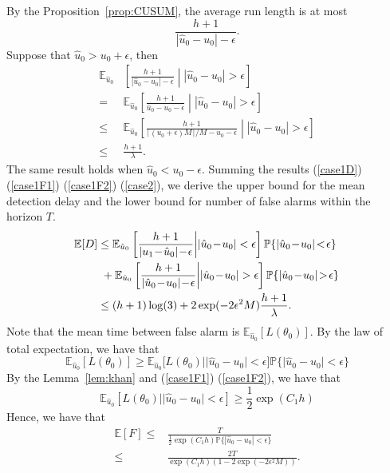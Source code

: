 \documentclass[letterpaper]{article} %
\begin{document}
By the Proposition~\ref{prop:CUSUM}, the average run length is at most
\begin{equation}
\frac{h+1}{|\hat{u}_0-u_0|-\epsilon}.
\end{equation}
Suppose that $\hat{u}_0>u_0+\epsilon$, then
\begin{align}
\mathbb{E}_{\hat{u}_0}&\left[\frac{h+1}{|\hat{u}_0-u_0|-\epsilon}\middle||\hat{u}_0-u_0|>\epsilon\right]\\
=&\mathbb{E}_{\hat{u}_0}\left[\frac{h+1}{\hat{u}_0-u_0-\epsilon}\middle||\hat{u}_0-u_0|>\epsilon\right]\\
\leq&\mathbb{E}_{\hat{u}_0}\left[\frac{h+1}{\lceil(u_0+\epsilon)M\rceil/M-u_0-\epsilon}\middle||\hat{u}_0-u_0|>\epsilon\right]\\\label{case2}
\leq&\frac{h+1}{\lambda}.
\end{align}
The same result holds when $\hat{u}_0<u_0-\epsilon$. 
Summing the results (\ref{case1D}) (\ref{case1F1}) (\ref{case1F2}) (\ref{case2}), we derive the upper bound for the mean detection delay and the lower bound for number of false alarms within the horizon $T$.
\begin{align}
\hspace{-0.05cm}\mathbb{E}[D]&\leq\mathbb{E}_{\hat{u}_0}\left[\frac{h+1}{|u_1 \!-\!\hat{u}_0|\!-\!\epsilon}\middle||\hat{u}_0 \!-\! u_0|<\epsilon\right]\mathbb{P}\{|\hat{u}_0 \!-\! u_0|\!<\!\epsilon\}\\
&\,\,+\mathbb{E}_{\hat{u}_0}\left[\frac{h+1}{|\hat{u}_0 \!-\! u_0|\!-\!\epsilon}\middle||\hat{u}_0 \!-\! u_0|>\epsilon\right]\mathbb{P}\{|\hat{u}_0 \!-\! u_0|\!>\!\epsilon\}\\
&\leq(h+1)\log(3)+2\exp(-2\epsilon^2M)\frac{h+1}{\lambda}.
\end{align}
Note that the mean time between false alarm is $\mathbb{E}_{\hat{u}_0}[L(\theta_0)]$. By the law of total expectation, we have that
\begin{equation}
\mathbb{E}_{\hat{u}_0}[L(\theta_0)]\geq\mathbb{E}_{\hat{u}_0}[L(\theta_0)||\hat{u}_0-u_0|<\epsilon]\mathbb{P}\{|\hat{u}_0-u_0|<\epsilon\}
\end{equation}
By the Lemma~\ref{lem:khan} and (\ref{case1F1}) (\ref{case1F2}), we have that
\begin{equation}
\mathbb{E}_{\hat{u}_0}[L(\theta_0)||\hat{u}_0-u_0|<\epsilon]\geq\frac{1}{2}\exp(C_1h)
\end{equation}
Hence, we have that
\begin{align}
\mathbb{E}[F]\leq&\frac{T}{\frac{1}{2}\exp(C_1h)\mathbb{P}\{|\hat{u}_0-u_0|<\epsilon\}}\\
\leq&\frac{2T}{\exp(C_1h)(1-2\exp(-2\epsilon^2M))}.
\end{align}
\end{document}
